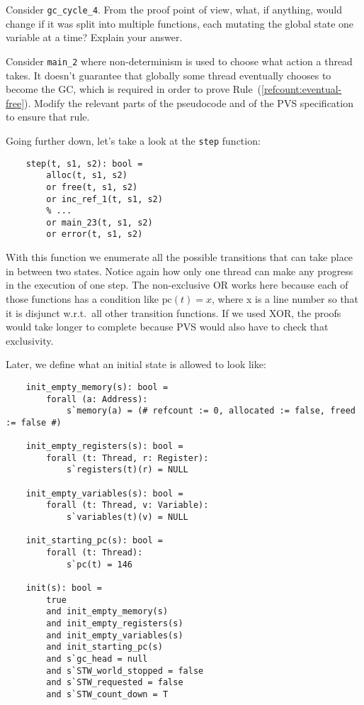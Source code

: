\begin{exercise}\label{ex:gc-cycle-4}
	Consider \texttt{gc\_cycle\_4}.
	From the proof point of view, what, if anything, would change if it was split into multiple functions, each mutating the global state one variable at a time?
	Explain your answer.
\end{exercise}

\begin{exercise}
	Consider \texttt{{main\_2}} where non-determinism is used to choose what action a thread takes.
	It doesn't guarantee that globally some thread eventually chooses to become the GC, which is required in order to prove Rule~(\ref{refcount:eventual-free}).
	Modify the relevant parts of the pseudocode and of the PVS specification to ensure that rule.
\end{exercise}

Going further down, let's take a look at the \texttt{step} function:
\begin{verbatim}
	step(t, s1, s2): bool =
	    alloc(t, s1, s2)
	    or free(t, s1, s2)
	    or inc_ref_1(t, s1, s2)
	    % ...
	    or main_23(t, s1, s2)
	    or error(t, s1, s2)
\end{verbatim}

With this function we enumerate all the possible transitions that can take place in between two states.
Notice again how only one thread can make any progress in the execution of one step.
The non-exclusive OR works here because each of those functions has a condition like $\mathrm{pc}(t) = x$, where x is a line number so that it is disjunct w.r.t.\ all other transition functions.
If we used XOR, the proofs would take longer to complete because PVS would also have to check that exclusivity.

Later, we define what an initial state is allowed to look like:
\begin{verbatim}
	init_empty_memory(s): bool =
	    forall (a: Address):
	        s`memory(a) = (# refcount := 0, allocated := false, freed := false #)

	init_empty_registers(s): bool =
	    forall (t: Thread, r: Register):
	        s`registers(t)(r) = NULL

	init_empty_variables(s): bool =
	    forall (t: Thread, v: Variable):
	        s`variables(t)(v) = NULL

	init_starting_pc(s): bool =
	    forall (t: Thread):
	        s`pc(t) = 146

	init(s): bool =
	    true
	    and init_empty_memory(s)
	    and init_empty_registers(s)
	    and init_empty_variables(s)
	    and init_starting_pc(s)
	    and s`gc_head = null
	    and s`STW_world_stopped = false
	    and s`STW_requested = false
	    and s`STW_count_down = T
\end{verbatim}

